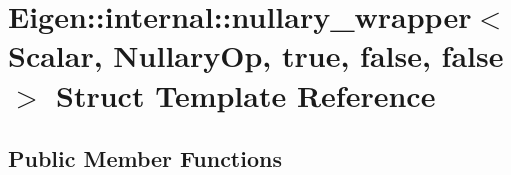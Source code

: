 \hypertarget{struct_eigen_1_1internal_1_1nullary__wrapper_3_01_scalar_00_01_nullary_op_00_01true_00_01false_00_01false_01_4}{}\section{Eigen\+:\+:internal\+:\+:nullary\+\_\+wrapper$<$ Scalar, Nullary\+Op, true, false, false $>$ Struct Template Reference}
\label{struct_eigen_1_1internal_1_1nullary__wrapper_3_01_scalar_00_01_nullary_op_00_01true_00_01false_00_01false_01_4}
\subsection*{Public Member Functions}

